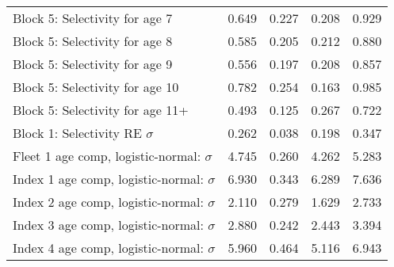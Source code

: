\documentclass[
]{article}
\begin{document}
\begin{landscape}
\begin{longtable}[t]{lrrrr}
\addlinespace
Block 5: Selectivity for age 7 & 0.649 & 0.227 & 0.208 & 0.929\\
Block 5: Selectivity for age 8 & 0.585 & 0.205 & 0.212 & 0.880\\
Block 5: Selectivity for age 9 & 0.556 & 0.197 & 0.208 & 0.857\\
Block 5: Selectivity for age 10 & 0.782 & 0.254 & 0.163 & 0.985\\
Block 5: Selectivity for age 11+ & 0.493 & 0.125 & 0.267 & 0.722\\
\addlinespace
Block 1: Selectivity RE $\sigma$ & 0.262 & 0.038 & 0.198 & 0.347\\
Fleet 1 age comp, logistic-normal: $\sigma$ & 4.745 & 0.260 & 4.262 & 5.283\\
Index 1 age comp, logistic-normal: $\sigma$ & 6.930 & 0.343 & 6.289 & 7.636\\
Index 2 age comp, logistic-normal: $\sigma$ & 2.110 & 0.279 & 1.629 & 2.733\\
Index 3 age comp, logistic-normal: $\sigma$ & 2.880 & 0.242 & 2.443 & 3.394\\
\addlinespace
Index 4 age comp, logistic-normal: $\sigma$ & 5.960 & 0.464 & 5.116 & 6.943\\*
\end{longtable}
\end{landscape}
\end{document}
